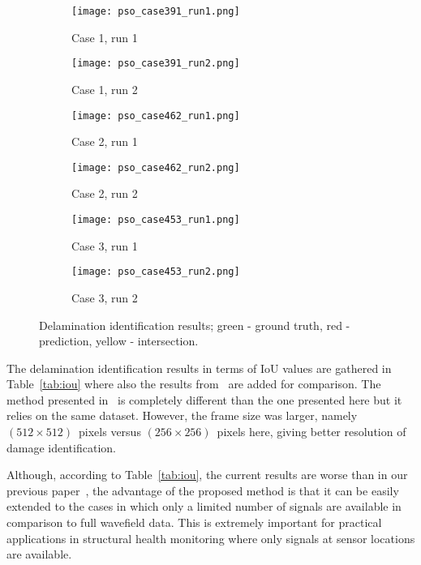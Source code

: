 \begin{figure} []
	\centering
	\begin{subfigure}[b]{0.44\textwidth}
		\centering
		\texttt{[image: pso\_case391\_run1.png]}
		\caption{Case 1, run 1}
		\label{fig:pso_case391_run1}
	\end{subfigure}
	\hfill
	\begin{subfigure}[b]{0.44\textwidth}
		\centering
		\texttt{[image: pso\_case391\_run2.png]}
		\caption{Case 1, run 2}
		\label{fig:pso_case391_run2}
	\end{subfigure}
	\hfill
	\begin{subfigure}[b]{0.44\textwidth}
		\centering
		\texttt{[image: pso\_case462\_run1.png]}
		\caption{Case 2, run 1}
		\label{fig:pso_case462_run1}
	\end{subfigure}
	\hfill
	\begin{subfigure}[b]{0.44\textwidth}
		\centering
		\texttt{[image: pso\_case462\_run2.png]}
		\caption{Case 2, run 2}
		\label{fig:pso_case462_run2}
	\end{subfigure}
	\hfill
	\begin{subfigure}[b]{0.44\textwidth}
		\centering
		\texttt{[image: pso\_case453\_run1.png]}
		\caption{Case 3, run 1}
		\label{fig:pso_case453_run1}
	\end{subfigure}
	\hfill
	\begin{subfigure}[b]{0.44\textwidth}
		\centering
		\texttt{[image: pso\_case453\_run2.png]}
		\caption{Case 3, run 2}
		\label{fig:pso_case453_run2}
	\end{subfigure}
	\hfill
	\caption{Delamination identification results; green - ground truth, red - prediction, yellow - intersection.}
	\label{fig:pso_identification}
\end{figure}

The delamination identification results in terms of IoU values are gathered in Table~\ref{tab:iou} where also the results from~\cite{Ullah2023} are added for comparison.
The method presented in~\cite{Ullah2023} is completely different than the one presented here but it relies on the same dataset.
However, the frame size was larger, namely \((512\times512)\)~pixels versus \((256\times256)\)~pixels here, giving better resolution of damage identification.

Although, according to Table~\ref{tab:iou}, the current results are worse than in our previous paper~\cite{Ullah2023}, the advantage of the proposed method is that it can be easily extended to the cases in which only a limited number of signals are available in comparison to full wavefield data.
This is extremely important for practical applications in structural health monitoring where only signals at sensor locations are available.
 
